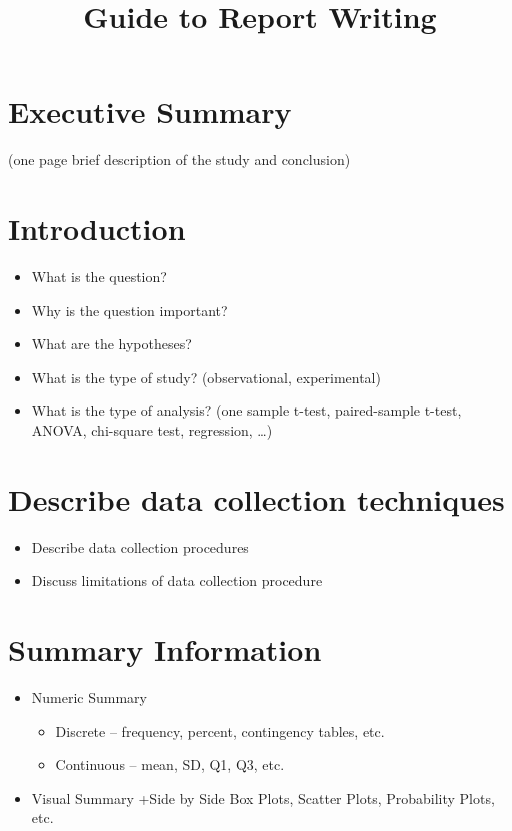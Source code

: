 \documentclass[10pt]{article}
\title{Guide to Report Writing}
\date{\vspace{-0.5in}}
\begin{document}
\maketitle

\thispagestyle{empty}

\section*{Executive Summary}
\label{sec-1}

(one page brief description of the study and conclusion)
\section*{Introduction}
\label{sec-2}

\begin{itemize}
\item What is the question?
\item Why is the question important?
\item What are the hypotheses?
\item What is the type of study? (observational, experimental)
\item What is the type of analysis? (one sample t-test, paired-sample t-test, ANOVA, chi-square test, regression, \ldots{})
\end{itemize}
\section*{Describe data collection techniques}
\label{sec-3}

\begin{itemize}
\item Describe data collection procedures
\item Discuss limitations of data collection procedure
\end{itemize}
\section*{Summary Information}
\label{sec-4}

\begin{itemize}
\item Numeric Summary
\begin{itemize}
\item Discrete – frequency, percent, contingency tables, etc.
\item Continuous – mean, SD, Q1, Q3, etc.
\end{itemize}
\item Visual Summary
  +Side by Side Box Plots, Scatter Plots, Probability Plots, etc.
\end{itemize}
\end{document}
